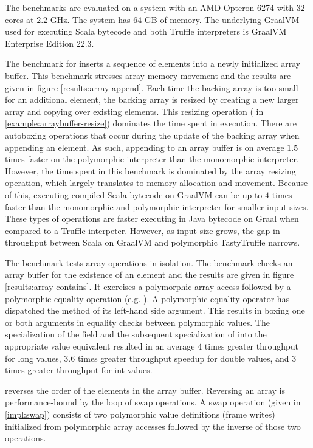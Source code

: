 The benchmarks are evaluated on a system with an AMD Opteron 6274 with $32$ cores at $2.2$ GHz.
The system has $64$ GB of memory.
The underlying GraalVM used for executing Scala bytecode and both Truffle interpreters is GraalVM Enterprise Edition 22.3.

The benchmark for  inserts a sequence of elements into a newly initialized array buffer. 
This benchmark stresses array memory movement and the results are given in figure \ref{results:array-append}.
Each time the backing array is too small for an additional element, the backing array is resized by creating a new larger array and copying over existing elements.
This resizing operation ( in \ref{example:arraybuffer-resize}) dominates the time spent in execution.
There are autoboxing operations that occur during the update of the backing array when appending an element.
As such, appending to an array buffer is on average $1.5$ times faster on the polymorphic interpreter than the monomorphic interpreter.
However, the time spent in this benchmark is dominated by the array resizing operation, which largely translates to memory allocation and movement.
Because of this, executing compiled Scala bytecode on GraalVM can be up to $4$ times faster than the monomorphic and polymorphic interpreter for smaller input sizes.
These types of operations are faster executing in Java bytecode on Graal when compared to a Truffle interpeter.
However, as input size grows, the gap in throughput between Scala on GraalVM and polymorphic TastyTruffle narrows.

The  benchmark tests array operations in isolation. 
The benchmark checks an array buffer for the existence of an element and the results are given in figure \ref{results:array-contains}.
It exercises a polymorphic array access followed by a polymorphic equality operation (e.g. ).
A polymorphic equality operator has dispatched the  method of its left-hand side argument.
This results in boxing one or both arguments in equality checks between polymorphic values.
The specialization of the  field and the subsequent specialization of  into the appropriate value equivalent resulted in an average $4$ times greater throughput for long values, $3.6$ times greater throughput  speedup for double values, and $3$ times greater throughput for int values.

 reverses the order of the elements in the array buffer.
Reversing an array is performance-bound by the loop of swap operations.
A swap operation (given in \ref{impl:swap}) consists of two polymorphic value definitions (frame writes) initialized from polymorphic array accesses followed by the inverse of those two operations.

